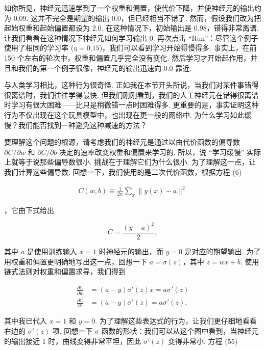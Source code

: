如你所见，神经元迅速学到了一个权重和偏置，使代价下降，并使神经元的输出约为 $0.09$. 这并不完全是期望的输出 $0.0$，但已经相当不错了. 然而，假设我们改为把起始权重和起始偏置都设为 $2.0$. 在这种情况下，初始输出是 $0.98$，错得非常离谱. 让我们看看在这种情况下神经元如何学习输出 $0$. 再次点击 ``Run''：尽管这个例子使用了相同的学习率 ($\eta = 0.15$)，我们可以看到学习开始得慢得多. 事实上，在前 150 个左右的轮次中，权重和偏置几乎完全没有变化. 然后学习才开始起作用，并且和我们的第一个例子很像，神经元的输出迅速向 $0.0$ 靠近.

与人类学习相比，这种行为很奇怪. 正如我在本节开头所说，当我们对某件事错得很离谱时，我们往往学得最快. 但我们刚刚看到，我们的人工神经元在错得很离谱时学习有很大困难——比只是稍微错一点时困难得多. 更重要的是，事实证明这种行为不仅出现在这个玩具模型中，也出现在更一般的网络中. 为什么学习如此缓慢？我们能否找到一种避免这种减速的方法？

要理解这个问题的根源，请考虑我们的神经元是通过以由代价函数的偏导数 $\partial C/\partial w$ 和 $\partial C / \partial b$ 决定的速率改变权重和偏置来学习的. 所以，说 ``学习缓慢'' 实际上就等于说那些偏导数很小. 挑战在于理解它们为什么很小. 为了理解这一点，让我们计算这些偏导数. 回想一下，我们使用的是二次代价函数，根据方程 (6)

\begin{align*}
C(w,b) \equiv \frac{1}{2n} \sum_x \| y(x) - a\|^2 \nonumber
\end{align*}

\noindent，它由下式给出

\begin{equation}
C = \frac{(y-a)^2}{2},
\tag{54}
\end{equation}

\noindent 其中 $a$ 是使用训练输入 $x = 1$ 时神经元的输出，而 $y = 0$ 是对应的期望输出. 为了用权重和偏置更明确地写出这一点，回想一下 $a = \sigma(z)$，其中 $z = wx+b$. 使用链式法则对权重和偏置求导，我们得到

\begin{align}
\frac{\partial C}{\partial w} &= (a-y)\sigma'(z) x = a \sigma'(z) \tag{55} \\ \frac{\partial C}{\partial b} &= (a-y)\sigma'(z) = a \sigma'(z), \tag{56}
\end{align}

\noindent 其中我已代入 $x = 1$ 和 $y = 0$. 为了理解这些表达式的行为，让我们更仔细地看看右边的 $\sigma'(z)$ 项. 回想一下 $\sigma$ 函数的形状：我们可以从这个图中看到，当神经元的输出接近 $1$ 时，曲线变得非常平坦，因此 $\sigma'(z)$ 变得非常小. 方程 (55)

